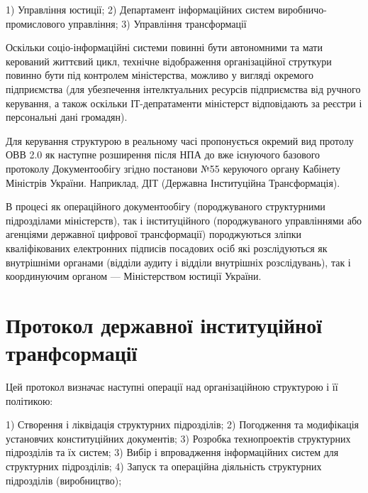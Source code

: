 1) Управління юстиції;
2) Департамент інформаційних систем виробничо-промислового управління;
3) Управління трансформації

Оскільки соціо-інформаційні системи повинні бути автономними та мати
керований життєвий цикл, технічне відображення організаційної струткури
повинно бути під контролем міністерства, можливо у вигляді окремого
підприємства (для убезпечення інтелктуальних ресурсів підприємства
від ручного керування, а також оскільки ІТ-депратаменти міністерст
відповідають за реєстри і персональні дані громадян).

Для керування структурою в реальному часі пропонується окремий вид
протолу ОВВ 2.0 як наступне розширення після НПА до вже існуючого
базового протоколу Документообігу згідно постанови №55 керуючого
органу Кабінету Міністрів України. Наприклад, ДІТ (Державна
Інституційна Трансформація).

В процесі як операційного документообігу (породжуваного структурними
підрозділами міністерств), так і інституційного (породжуваного управліннями
або агенціями державної цифрової трансформації) породжуються зліпки кваліфікованих
електронних підписів посадових осіб які розслідуються як внутрішніми
органами (відділи аудиту і відділи внутрішніх розслідувань), так і
координуючим органом — Міністерством юстиції України.

\section{Протокол державної інституційної транфсормації}

Цей протокол визначає наступні операції над організаційною структурою і її політикою:

1) Створення і ліквідація структурних підрозділів;
2) Погодження та модифікація установчих конституційних документів;
3) Розробка технопроектів структурних підрозділів та їх систем;
3) Вибір і впровадження інформаційних систем для структурних підрозділів;
4) Запуск та операційна діяльність структурних підрозділів (виробництво);

